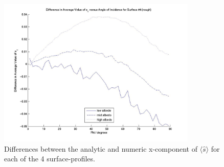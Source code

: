 \begin{description}
\begin{figure}[!ht]
        \includegraphics[width=95mm]{figs/sda/unit_vec_diff__x__rough.jpg}
        \caption{Differences between the analytic and numeric x-component of
                 $\langle \hat{s}\rangle$ for each of the 4
                 surface-profiles.}
        \label{fig:ivv_sda_s_vector_diffs_x}
      \end{figure}


\end{description}

